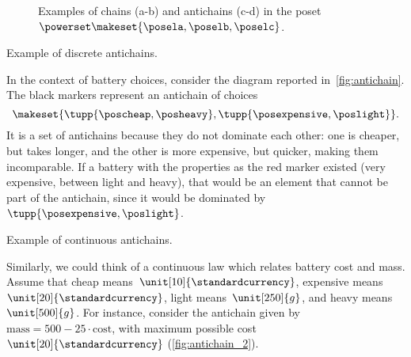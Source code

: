 \begin{figure*}
    \caption{Examples of chains (a-b) and antichains (c-d) in the poset $\powerset\makeset{\posela,\poselb,\poselc}$.}
\end{figure*}

\clearpage

\begin{marginfigure}
    \centering
    \caption{Example of discrete antichains.
    }
    \label{fig:antichain}
\end{marginfigure}
\begin{example}
    In the context of battery choices, consider the diagram reported in~\cref{fig:antichain}.
    The black markers represent an antichain of choices
    \begin{equation}
        \makeset{
            \tupp{\poscheap,\posheavy},
            \tupp{\posexpensive,\poslight}
        }.
    \end{equation}
    It is a set of antichains because they do not dominate each other: one is cheaper, but takes longer, and the other is more expensive, but quicker, making them incomparable.
    If a battery with the properties as the red marker existed (very expensive, between light and heavy), that would be an element that cannot be part of the antichain, since it would be dominated by~$\tupp{\posexpensive,\poslight}$.
    \begin{marginfigure}
        \centering
        \caption{Example of continuous antichains.}
        \label{fig:antichain_2}
    \end{marginfigure}
    Similarly, we could think of a continuous law which relates battery cost and mass.
    Assume that cheap means~$\unit[10]{\standardcurrency}$, expensive means~$\unit[20]{\standardcurrency}$, light means~$\unit[250]{g}$, and heavy means~$\unit[500]{g}$.
    For instance, consider the antichain given by~$\text{mass}=500-25\cdot \text{cost}$, with maximum possible cost~$\unit[20]{\standardcurrency}$ (\cref{fig:antichain_2}).
\end{example}

